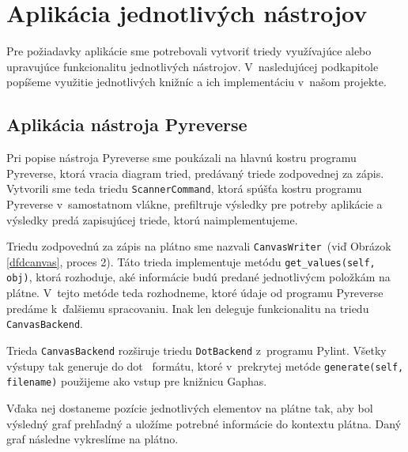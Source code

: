 \documentclass[11pt,oneside,final]{fithesis2}
\begin{document}
	
	\section{Aplikácia jednotlivých nástrojov}
	Pre požiadavky aplikácie sme potrebovali vytvoriť triedy využívajúce alebo upravujúce funkcionalitu jednotlivých nástrojov. V~nasledujúcej podkapitole popíšeme využitie jednotlivých knižníc a ich implementáciu v~našom projekte.
	
		\subsection{Aplikácia nástroja Pyreverse}	
			Pri popise nástroja Pyreverse sme poukázali na hlavnú kostru programu Pyreverse, ktorá vracia diagram tried, predávaný triede zodpovednej za zápis. Vytvorili sme teda triedu \texttt{ScannerCommand}, ktorá spúšťa kostru programu Pyreverse v~samostatnom vlákne, prefiltruje výsledky pre potreby aplikácie a výsledky predá zapisujúcej triede, ktorú naimplementujeme.
			
			Triedu zodpovednú za zápis na plátno sme nazvali \texttt{CanvasWriter}~(viď Obrázok \ref{dfdcanvas}, proces 2). Táto trieda  implementuje metódu \texttt{get\_values(self, obj)}, ktorá rozhoduje, aké informácie budú predané jednotlivýcm položkám na plátne. V~tejto metóde teda rozhodneme, ktoré údaje od programu Pyreverse predáme k~ďalšiemu spracovaniu. Inak len deleguje funkcionalitu na triedu \texttt{CanvasBackend}.
		
			Trieda \texttt{CanvasBackend} rozširuje triedu \texttt{DotBackend} z~programu Pylint. Všetky výstupy tak generuje do dot~\cite{dotformat} formátu, ktoré v~prekrytej metóde \texttt{generate(self, filename)} použijeme ako vstup pre knižnicu Gaphas. 
			
			Vďaka nej dostaneme pozície jednotlivých elementov na plátne tak, aby bol výsledný graf prehľadný a uložíme potrebné informácie do kontextu plátna. Daný graf následne vykreslíme na plátno.
	
\end{document}

